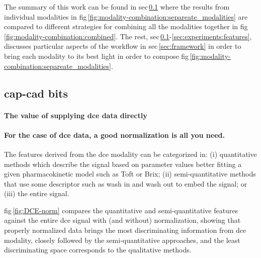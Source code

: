 \documentclass[a4paper,num-refs]{wiley-article}
\begin{document}
The summary of this work can be found in \ac{sec}\,\ref{sec:experiments:mpmri-comparison}
where the results from individual modalities in
\Ac{fig}\,\ref{fig:modality-combination:separeate_modalities} are compared to
different strategies for combining all the modalities together in \Ac{fig}\,\ref{fig:modality-combination:combined}.
The rest,
\ac{sec}\,\ref{sec:experiments:mpmri-comparison}-\ref{sec:experiments:features}, 
discusses particular aspects
of the workflow in \Ac{sec}\,\ref{sec:framework} in order to bring each
modality to its best light in order to compose \Ac{fig}\,\ref{fig:modality-combination:separeate_modalities}.

\subsection{\ac{cap}-\ac{cad} bits}
\label{sec:experiments:mpmri-comparison}
\paragraph{The value of supplying \ac{dce} data directly}
\paragraph{For the case of \ac{dce} data, a good normalization is all you need.}

The features derived from the \ac{dce} modality can be categorized in: 
(i) quantitative methods which describe the signal based on parameter values
better fitting a given pharmacokinetic model such as Toft or Brix;
(ii) semi-quantitative methods that use some descriptor such as wash in and wash
out to embed the signal;
or (iii) the entire signal.

%
\Acl{fig}\,\ref{fig:DCE-norm} compares the quantitative and semi-quantitative
features against the entire \ac{dce} signal with (and without) normalization,
showing that properly normalized data brings the most discriminating information
from \ac{dce} modality, closely followed by the semi-quantitative approaches,
and the least discriminating space corresponds to the qualitative methods.
\end{document}
